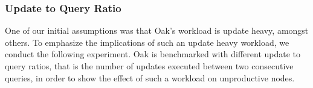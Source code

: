 \documentclass[abstracton,12pt]{scrartcl}
\theoremstyle{definition}
\begin{document}




\subsubsection{Update to Query Ratio}

\label{sec:update-query-ratio}

One of our initial assumptions was that Oak's workload is update heavy, amongst others.
To emphasize the implications of such an update heavy workload, we conduct the following
experiment. Oak is benchmarked with different update to query ratios,
that is the number of updates executed between two consecutive queries,
in order to show the effect of such a workload
on unproductive nodes. 
\end{document}
